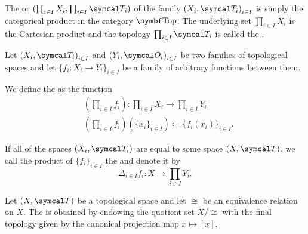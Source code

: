 \begin{definition}\label{def:topological_product}
  The  or  \( (\prod_{i \in I} X_i, \prod_{i \in I} \Cal{T}_i) \) of the family \( { (X_i, \Cal{T}_i) }_{i \in I} \) is simply the categorical product in the category \( \Bold{Top} \). The underlying set \( \prod_{i \in I} X_i \) is the Cartesian product and the topology \( \prod_{i \in I} \Cal{T}_i \) is called the .

  Let \( { (X_i, \Cal{T}_i) }_{i \in I} \) and \( { (Y_i, \Cal{O}_i) }_{i \in I} \) be two families of topological spaces and let \( \{ f_i: X_i \to Y_i \}_{i \in I} \) be a family of arbitrary functions between them.

  We define the  as the function
  \begin{align*}
    &\left(\prod_{i \in I} f_i \right): \prod_{i \in I} X_i \to \prod_{i \in I} Y_i \\
    &\left(\prod_{i \in I} f_i \right)(\{ x_i \}_{i \in I}) \coloneqq \{ f_i (x_i) \}_{i \in I}.
  \end{align*}

  If all of the spaces \( (X_i, \Cal{T}_i) \) are equal to some space \( (X, \Cal{T}) \), we call the product of \( \{ f_i \}_{i \in I} \) the  and denote it by
  \begin{equation*}
    \Delta_{i \in I} f_i: X \to \prod_{i \in I} Y_i.
  \end{equation*}
\end{definition}

\begin{definition}\label{def:topological_quotient}\cite[90]{Engelking1989}
  Let \( (X, \Cal{T}) \) be a topological space and let \( \cong \) be an equivalence relation on \( X \). The  is obtained by endowing the quotient set \( X / \cong \) with the final topology given by the canonical projection map \( x \mapsto [x] \).
\end{definition}


